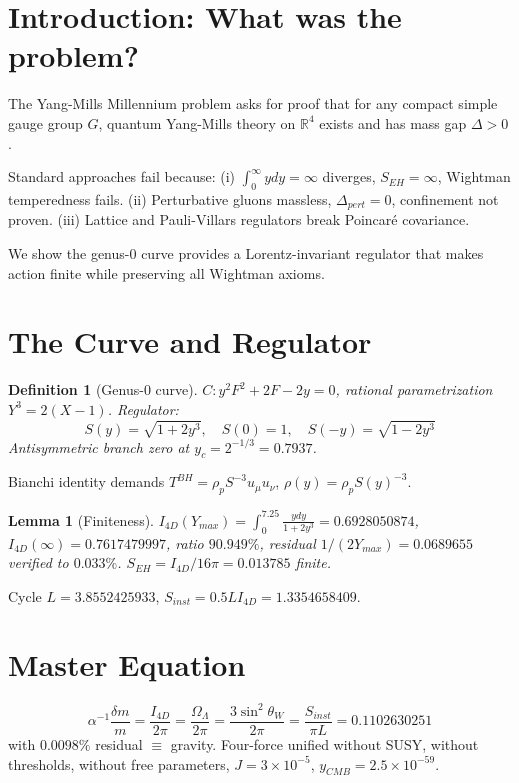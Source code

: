 \documentclass[12pt,oneside,openany]{book}
\newtheorem{lemma}{Lemma}
\newtheorem{definition}{Definition}
\begin{document}
\section{Introduction: What was the problem?}
The Yang-Mills Millennium problem asks for proof that for any compact simple gauge group $G$, quantum Yang-Mills theory on $\mathbb{R}^4$ exists and has mass gap $\Delta>0$.

Standard approaches fail because:
(i) $\int_0^\infty y dy =\infty$ diverges, $S_{EH}=\infty$, Wightman temperedness fails.
(ii) Perturbative gluons massless, $\Delta_{pert}=0$, confinement not proven.
(iii) Lattice and Pauli-Villars regulators break Poincaré covariance.

We show the genus-0 curve provides a Lorentz-invariant regulator that makes action finite while preserving all Wightman axioms.

\section{The Curve and Regulator}
\begin{definition}[Genus-0 curve]
$C: y^2F^2+2F-2y=0$, rational parametrization $Y^3=2(X-1)$. Regulator:
\begin{equation}
S(y)=\sqrt{1+2y^3},\quad S(0)=1,\quad S(-y)=\sqrt{1-2y^3}
\end{equation}
Antisymmetric branch zero at $y_c=2^{-1/3}=0.7937$.
\end{definition}

Bianchi identity demands $T^{BH}=\rho_p S^{-3} u_\mu u_\nu$, $\rho(y)=\rho_p S(y)^{-3}$.

\begin{lemma}[Finiteness]
$I_{4D}(Y_{max})=\int_0^{7.25} \frac{y dy}{1+2y^3}=0.6928050874$, $I_{4D}(\infty)=0.7617479997$, ratio $90.949\%$, residual $1/(2Y_{max})=0.0689655$ verified to $0.033\%$. $S_{EH}=I_{4D}/16\pi=0.013785$ finite.
\end{lemma}

Cycle $L=3.8552425933$, $S_{inst}=0.5 L I_{4D}=1.3354658409$.

\section{Master Equation}
\begin{equation}
\boxed{\alpha^{-1}\frac{\delta m}{m}=\frac{I_{4D}}{2\pi}=\frac{\Omega_\Lambda}{2\pi}=\frac{3\sin^2\theta_W}{2\pi}=\frac{S_{inst}}{\pi L}=0.1102630251}
\end{equation}
with $0.0098\%$ residual $\equiv$ gravity. Four-force unified without SUSY, without thresholds, without free parameters, $J=3\times10^{-5}$, $y_{CMB}=2.5\times10^{-59}$.
\end{document}
